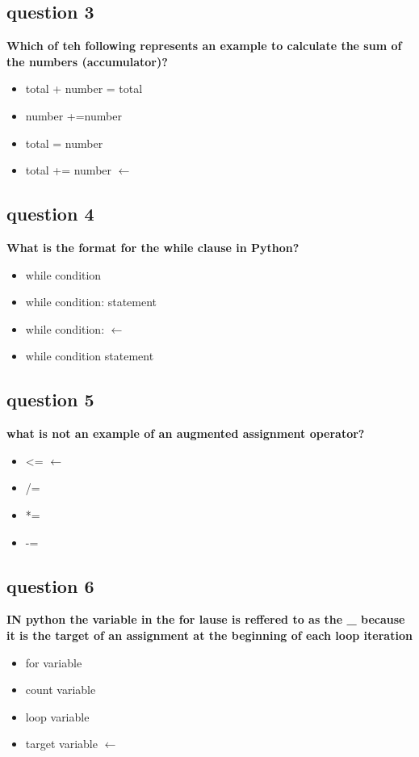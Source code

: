 \documentclass[10pt]{article}
\begin{document}
\subsection*{question 3}
\textbf{Which of teh following represents an example to calculate the sum of the numbers (accumulator)?}
\begin{itemize}
\item total + number = total
\item number +=number 
\item total = number
\item total += number $\leftarrow$
\end{itemize}
\subsection*{question 4}
\textbf{What is the format for the while clause in Python?}
\begin{itemize}
\item while condition
\item while condition: statement
\item while condition: $\leftarrow$
\item while condition statement
\end{itemize}
\subsection*{question 5}
\textbf{what is not an example of an augmented assignment operator?}
\begin{itemize}
\item <= $\leftarrow$
\item /=
\item *=
\item -=
\end{itemize}
\subsection*{question 6}
\textbf{IN python the variable in the for lause is reffered to as the \_ because it is the target of an assignment at the beginning of each loop iteration}
\begin{itemize}
\item for variable
\item count variable
\item loop variable
\item target variable $\leftarrow$
\end{itemize}
\end{document}
